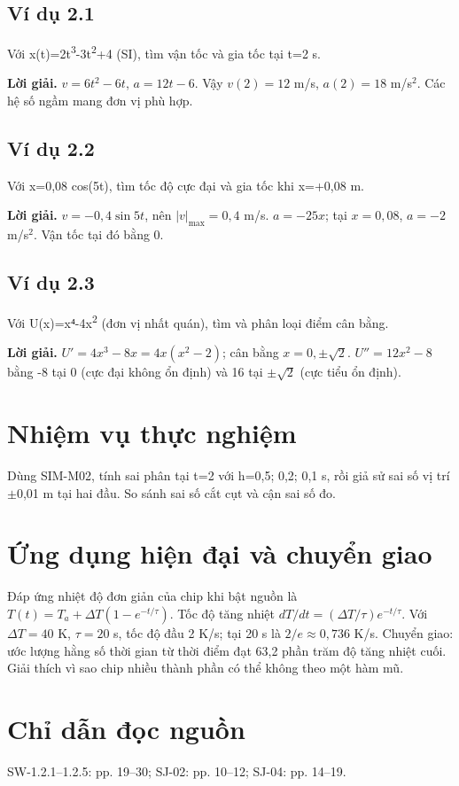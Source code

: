 \documentclass[11pt,a4paper,openany]{book}
\begin{document}
\subsection*{Ví dụ 2.1}
Với x(t)=2t\textsuperscript{3}-3t\textsuperscript{2}+4 (SI), tìm vận tốc và gia tốc tại t=2 s.

\textbf{Lời giải.} $v=6t^2-6t$, $a=12t-6$. Vậy $v(2)=12$ m/s, $a(2)=18$ m/s$^2$. Các hệ số ngầm mang đơn vị phù hợp.
\subsection*{Ví dụ 2.2}
Với x=0,08 cos(5t), tìm tốc độ cực đại và gia tốc khi x=+0,08 m.

\textbf{Lời giải.} $v=-0{,}4\sin5t$, nên $|v|_{\max}=0{,}4$ m/s. $a=-25x$; tại $x=0{,}08$, $a=-2$ m/s$^2$. Vận tốc tại đó bằng 0.
\subsection*{Ví dụ 2.3}
Với U(x)=x⁴-4x\textsuperscript{2} (đơn vị nhất quán), tìm và phân loại điểm cân bằng.

\textbf{Lời giải.} $U'=4x^3-8x=4x(x^2-2)$; cân bằng $x=0,\pm\sqrt2$. $U''=12x^2-8$ bằng -8 tại 0 (cực đại không ổn định) và 16 tại $\pm\sqrt2$ (cực tiểu ổn định).
\section{Nhiệm vụ thực nghiệm}
Dùng SIM-M02, tính sai phân tại t=2 với h=0,5; 0,2; 0,1 s, rồi giả sử sai số vị trí \ensuremath{\pm}0,01 m tại hai đầu. So sánh sai số cắt cụt và cận sai số đo.
\section{Ứng dụng hiện đại và chuyển giao}
Đáp ứng nhiệt độ đơn giản của chip khi bật nguồn là $T(t)=T_a+\Delta T(1-e^{-t/\tau})$. Tốc độ tăng nhiệt $dT/dt=(\Delta T/\tau)e^{-t/\tau}$. Với $\Delta T=40$ K, $\tau=20$ s, tốc độ đầu 2 K/s; tại 20 s là $2/e\approx0{,}736$ K/s. Chuyển giao: ước lượng hằng số thời gian từ thời điểm đạt 63,2 phần trăm độ tăng nhiệt cuối. Giải thích vì sao chip nhiều thành phần có thể không theo một hàm mũ.
\section{Chỉ dẫn đọc nguồn}
SW-1.2.1–1.2.5: pp. 19–30; SJ-02: pp. 10–12; SJ-04: pp. 14–19.
\end{document}
